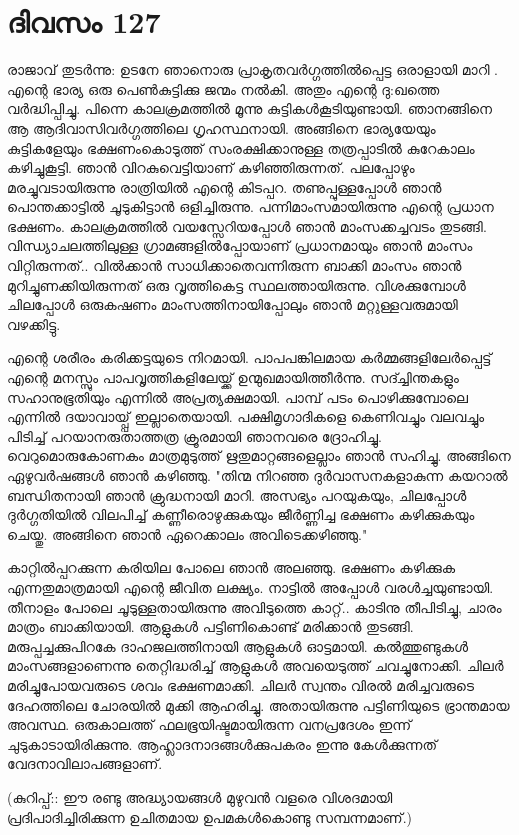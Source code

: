 \newpage
\section{ദിവസം 127}


രാജാവ്‌ തുടര്‍ന്നു: ഉടനേ ഞാനൊരു പ്രാകൃതവര്‍ഗ്ഗത്തില്‍പ്പെട്ട ഒരാളായി മാറി . എന്റെ ഭാര്യ ഒരു പെണ്‍കുട്ടിക്കു ജന്മം നല്‍കി. അതും എന്റെ ദു:ഖത്തെ വര്‍ദ്ധിപ്പിച്ചു. പിന്നെ കാലക്രമത്തില്‍ മൂന്നു കുട്ടികള്‍കൂടിയുണ്ടായി. ഞാനങ്ങിനെ ആ ആദിവാസിവര്‍ഗ്ഗത്തിലെ ഗൃഹസ്ഥനായി. അങ്ങിനെ ഭാര്യയേയും കുട്ടികളേയും ഭക്ഷണംകൊടുത്ത്‌ സംരക്ഷിക്കാനുള്ള തത്രപ്പാടില്‍ കുറേകാലം കഴിച്ചുകൂട്ടി. ഞാന്‍ വിറകുവെട്ടിയാണ്‌ കഴിഞ്ഞിരുന്നത്‌. പലപ്പോഴും മരച്ചുവടായിരുന്നു രാത്രിയില്‍ എന്റെ കിടപ്പറ. തണുപ്പുള്ളപ്പോള്‍ ഞാന്‍ പൊന്തക്കാട്ടില്‍ ചൂടുകിട്ടാന്‍ ഒളിച്ചിരുന്നു. പന്നിമാംസമായിരുന്നു എന്റെ പ്രധാന ഭക്ഷണം. കാലക്രമത്തില്‍ വയസ്സേറിയപ്പോള്‍ ഞാന്‍ മാംസക്കച്ചവടം തുടങ്ങി. വിന്ധ്യാചലത്തിലുള്ള ഗ്രാമങ്ങളില്‍പ്പോയാണ്‌ പ്രധാനമായും ഞാന്‍ മാംസം വിറ്റിരുന്നത്‌.. വില്‍ക്കാന്‍ സാധിക്കാതെവന്നിരുന്ന ബാക്കി മാംസം ഞാന്‍ മുറിച്ചുണക്കിയിരുന്നത്‌ ഒരു വൃത്തികെട്ട സ്ഥലത്തായിരുന്നു. വിശക്കുമ്പോള്‍ ചിലപ്പോള്‍  ഒരുകഷണം മാംസത്തിനായിപ്പോലും  ഞാന്‍ മറ്റുള്ളവരുമായി വഴക്കിട്ടു.

എന്റെ ശരീരം കരിക്കട്ടയുടെ നിറമായി. പാപപങ്കിലമായ കര്‍മ്മങ്ങളിലേര്‍പ്പെട്ട്‌ എന്റെ മനസ്സും പാപവൃത്തികളിലേയ്ക്ക്‌ ഉന്മുഖമായിത്തീര്‍ന്നു. സദ്ച്ചിന്തകളും സഹാനുഭൂതിയും എന്നില്‍ അപ്രത്യക്ഷമായി. പാമ്പ്‌ പടം പൊഴിക്കുമ്പോലെ എന്നില്‍ ദയാവായ്പ്പ്‌ ഇല്ലാതെയായി. പക്ഷിമൃഗാദികളെ കെണിവച്ചും വലവച്ചും പിടിച്ച്‌ പറയാനരുതാത്തത്ര ക്രൂരമായി ഞാനവരെ ദ്രോഹിച്ചു. വെറുമൊരുകോണകം മാത്രമുടുത്ത്‌ ഋതുമാറ്റങ്ങളെല്ലാം ഞാന്‍ സഹിച്ചു. അങ്ങിനെ ഏഴുവര്‍ഷങ്ങള്‍ ഞാന്‍ കഴിഞ്ഞു. "തിന്മ നിറഞ്ഞ ദുര്‍വാസനകളാകുന്ന കയറാല്‍ ബന്ധിതനായി ഞാന്‍ ക്രുദ്ധനായി മാറി. അസഭ്യം പറയുകയും, ചിലപ്പോള്‍ ദുര്‍ഗ്ഗതിയില്‍ വിലപിച്ച്‌ കണ്ണീരൊഴുക്കുകയും ജീര്‍ണ്ണിച്ച ഭക്ഷണം കഴിക്കുകയും ചെയ്തു. അങ്ങിനെ ഞാന്‍ ഏറെക്കാലം അവിടെക്കഴിഞ്ഞു."

കാറ്റില്‍പ്പറക്കുന്ന കരിയില പോലെ ഞാന്‍ അലഞ്ഞു. ഭക്ഷണം കഴിക്കുക എന്നതുമാത്രമായി എന്റെ ജീവിത ലക്ഷ്യം. നാട്ടില്‍ അപ്പോള്‍ വരള്‍ച്ചയുണ്ടായി. തീനാളം പോലെ ചൂടുള്ളതായിരുന്നു അവിടുത്തെ കാറ്റ്‌.. കാടിനു തീപിടിച്ചു, ചാരം മാത്രം ബാക്കിയായി. ആളുകള്‍ പട്ടിണികൊണ്ട്‌ മരിക്കാന്‍ തുടങ്ങി. മരുപ്പച്ചക്കുപിറകേ ദാഹജലത്തിനായി ആളുകള്‍ ഓട്ടമായി. കല്‍ത്തുണ്ടുകള്‍ മാംസങ്ങളാണെന്നു തെറ്റിദ്ധരിച്ച്‌ ആളുകള്‍ അവയെടുത്ത്‌ ചവച്ചുനോക്കി. ചിലര്‍ മരിച്ചുപോയവരുടെ ശവം ഭക്ഷണമാക്കി. ചിലര്‍ സ്വന്തം വിരല്‍ മരിച്ചവരുടെ ദേഹത്തിലെ ചോരയില്‍ മുക്കി ആഹരിച്ചു. അതായിരുന്നു പട്ടിണിയുടെ ഭ്രാന്തമായ അവസ്ഥ. ഒരുകാലത്ത്‌ ഫലഭൂയിഷ്ടമായിരുന്ന വനപ്രദേശം ഇന്ന് ചുടുകാടായിരിക്കുന്നു. ആഹ്ലാദനാദങ്ങള്‍ക്കുപകരം ഇന്നു കേള്‍ക്കുന്നത്‌ വേദനാവിലാപങ്ങളാണ്‌.

(കുറിപ്പ്‌:: ഈ രണ്ടു അദ്ധ്യായങ്ങള്‍ മുഴുവന്‍ വളരെ വിശദമായി പ്രദിപാദിച്ചിരിക്കുന്ന ഉചിതമായ ഉപമകള്‍കൊണ്ടു സമ്പന്നമാണ്‌.)

